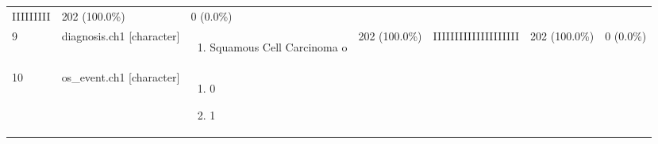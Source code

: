 \documentclass[
]{article}
\providecommand{\tightlist}{%
  \setlength{\itemsep}{0pt}\setlength{\parskip}{0pt}}
\begin{document}
\begin{longtable}[]{@{}lllllll@{}}
\begin{minipage}[t]{0.14\columnwidth}
IIIIIIIII\strut
\end{minipage} & \begin{minipage}[t]{0.07\columnwidth}\raggedright
202
(100.0\%)\strut
\end{minipage} & \begin{minipage}[t]{0.07\columnwidth}\raggedright
0
(0.0\%)\strut
\end{minipage}\tabularnewline
\begin{minipage}[t]{0.03\columnwidth}\raggedright
9\strut
\end{minipage} & \begin{minipage}[t]{0.16\columnwidth}\raggedright
diagnosis.ch1
{[}character{]}\strut
\end{minipage} & \begin{minipage}[t]{0.20\columnwidth}\raggedright
\begin{enumerate}
\def\labelenumi{\arabic{enumi}.}
\tightlist
\item
  Squamous Cell Carcinoma o
\end{enumerate}\strut
\end{minipage} & \begin{minipage}[t]{0.14\columnwidth}\raggedright
202 (100.0\%)\strut
\end{minipage} & \begin{minipage}[t]{0.14\columnwidth}\raggedright
IIIIIIIIIIIIIIIIIIII\strut
\end{minipage} & \begin{minipage}[t]{0.07\columnwidth}\raggedright
202
(100.0\%)\strut
\end{minipage} & \begin{minipage}[t]{0.07\columnwidth}\raggedright
0
(0.0\%)\strut
\end{minipage}\tabularnewline
\begin{minipage}[t]{0.03\columnwidth}\raggedright
10\strut
\end{minipage} & \begin{minipage}[t]{0.16\columnwidth}\raggedright
os\_event.ch1
{[}character{]}\strut
\end{minipage} & \begin{minipage}[t]{0.20\columnwidth}\raggedright
\begin{enumerate}
\def\labelenumi{\arabic{enumi}.}
\tightlist
\item
  0
\item
  1
\end{enumerate}\strut
\end{minipage} & \begin{minipage}[t]{0.14\columnwidth}\raggedright

\end{minipage}
\end{longtable}
\end{document}
